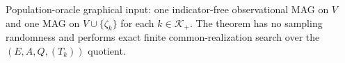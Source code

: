 Population-oracle graphical input: one indicator-free observational MAG on \(V\) and one MAG on \(V\cup\{\zeta_k\}\) for each \(k\in\mathcal K_+\).  The theorem has no sampling randomness and performs exact finite common-realization search over the \((E,A,Q,(T_k))\) quotient.